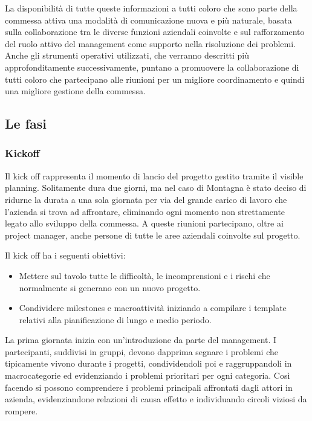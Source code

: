 \begin{multicols}{2}
	La disponibilità di tutte queste informazioni a tutti coloro che sono parte della commessa attiva una modalità di comunicazione nuova e più naturale, basata sulla collaborazione tra le diverse funzioni aziendali coinvolte e sul rafforzamento del ruolo attivo del management come supporto nella risoluzione dei problemi.
	Anche gli strumenti operativi utilizzati, che verranno descritti più approfonditamente successivamente, puntano a promuovere la collaborazione di tutti coloro che partecipano alle riunioni per un migliore coordinamento e quindi una migliore gestione della commessa.

\subsection{Le fasi}
	\subsubsection{Kickoff}
	Il kick off rappresenta il momento di lancio del progetto gestito tramite il visible planning. Solitamente dura due giorni, ma nel caso di Montagna è stato deciso di ridurne la durata a una sola giornata per via del grande carico di lavoro che l’azienda si trova ad affrontare, eliminando ogni momento non strettamente legato allo sviluppo della commessa. A queste riunioni partecipano, oltre ai project manager, anche persone di tutte le aree aziendali coinvolte sul progetto.

	Il kick off ha i seguenti obiettivi:
	\begin{itemize}
		\item Mettere sul tavolo tutte le difficoltà, le incomprensioni e i rischi che normalmente si generano con un nuovo progetto.
		\item Condividere milestones e macroattività iniziando a compilare i template relativi alla pianificazione di lungo e medio periodo.
	\end{itemize}

	La prima giornata inizia con un’introduzione da parte del management. I partecipanti, suddivisi in gruppi, devono dapprima segnare i problemi che tipicamente vivono durante i progetti, condividendoli poi e raggruppandoli in macrocategorie ed evidenziando i problemi prioritari per ogni categoria. Così facendo si possono comprendere i problemi principali affrontati dagli attori in azienda, evidenziandone relazioni di causa effetto e individuando circoli viziosi da rompere. 


\end{multicols}

